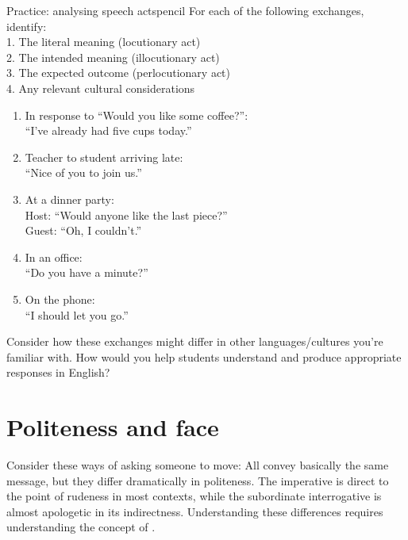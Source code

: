 \begin{tblsframedsymbol}{Practice: analysing speech acts}{pencil}
\setlength{\parindent}{1.5em}
\noindent For each of the following exchanges, identify:\\
\phantom{~~~}1. The literal meaning (locutionary act)\\
\phantom{~~~}2. The intended meaning (illocutionary act)\\
\phantom{~~~}3. The expected outcome (perlocutionary act)\\
\phantom{~~~}4. Any relevant cultural considerations
\begin{enumerate}[noitemsep, leftmargin=*]
    \item In response to \enquote{Would you like some coffee?}:\\
    \enquote{I've already had five cups today.}

    \item Teacher to student arriving late:\\
    \enquote{Nice of you to join us.}

    \item At a dinner party:\\
    Host: \enquote{Would anyone like the last piece?}\\
    Guest: \enquote{Oh, I couldn't.}

    \item In an office:\\
    \enquote{Do you have a minute?}

    \item On the phone:\\
    \enquote{I should let you go.}
\end{enumerate}

Consider how these exchanges might differ in other languages/cultures you're familiar with. How would you help students understand and produce appropriate responses in English?
\end{tblsframedsymbol}

\section{Politeness and face}\label{sec:politeness}

Consider these ways of asking someone to move:
\ea
    \z
\z
All convey basically the same message, but they differ dramatically in politeness. The imperative is direct to the point of rudeness in most contexts, while the subordinate interrogative is almost apologetic in its indirectness. Understanding these differences requires understanding the concept of .

